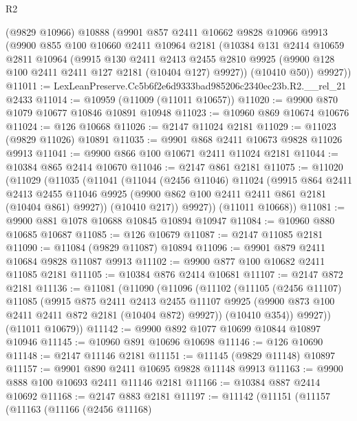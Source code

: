 \begin{lexlean}{R2}
\begin{coremodule}
    (@9829 @10966)
    @10888
    (@9901
      @857
      @2411
      @10662
      @9828
      @10966
      @9913
      (@9900
        @855
        @100
        @10660
        @2411
        @10964
        @2181
        (@10384
          @131
          @2414
          @10659
          @2811
          @10964
          (@9915
            @130
            @2411
            @2413
            @2455
            @2810
            @9925
            (@9900 @128 @100 @2411 @2411 @127 @2181 (@10404 @127) @9927))
          (@10410 @50))
        @9927))
@11011 := LexLeanPreserve.Cc5b6f2e6d9333bad985206c2340ec23b.R2.__rel_21 @2433
@11014 := @10959 (@11009 (@11011 @10657))
@11020 := @9900 @870 @1079 @10677 @10846 @10891 @10948
@11023 := @10960 @869 @10674 @10676
@11024 := @126 @10668
@11026 := @2147 @11024 @2181
@11029 := @11023 (@9829 @11026) @10891
@11035 := @9901 @868 @2411 @10673 @9828 @11026 @9913
@11041 := @9900 @866 @100 @10671 @2411 @11024 @2181
@11044 := @10384 @865 @2414 @10670
@11046 := @2147 @861 @2181
@11075 := @11020
    (@11029
      (@11035
        (@11041
          (@11044
            (@2456 @11046)
            @11024
            (@9915
              @864
              @2411
              @2413
              @2455
              @11046
              @9925
              (@9900 @862 @100 @2411 @2411 @861 @2181 (@10404 @861) @9927))
            (@10410 @217))
          @9927))
      (@11011 @10668))
@11081 := @9900 @881 @1078 @10688 @10845 @10894 @10947
@11084 := @10960 @880 @10685 @10687
@11085 := @126 @10679
@11087 := @2147 @11085 @2181
@11090 := @11084 (@9829 @11087) @10894
@11096 := @9901 @879 @2411 @10684 @9828 @11087 @9913
@11102 := @9900 @877 @100 @10682 @2411 @11085 @2181
@11105 := @10384 @876 @2414 @10681
@11107 := @2147 @872 @2181
@11136 := @11081
    (@11090
      (@11096
        (@11102
          (@11105
            (@2456 @11107)
            @11085
            (@9915
              @875
              @2411
              @2413
              @2455
              @11107
              @9925
              (@9900 @873 @100 @2411 @2411 @872 @2181 (@10404 @872) @9927))
            (@10410 @354))
          @9927))
      (@11011 @10679))
@11142 := @9900 @892 @1077 @10699 @10844 @10897 @10946
@11145 := @10960 @891 @10696 @10698
@11146 := @126 @10690
@11148 := @2147 @11146 @2181
@11151 := @11145 (@9829 @11148) @10897
@11157 := @9901 @890 @2411 @10695 @9828 @11148 @9913
@11163 := @9900 @888 @100 @10693 @2411 @11146 @2181
@11166 := @10384 @887 @2414 @10692
@11168 := @2147 @883 @2181
@11197 := @11142
    (@11151
      (@11157
        (@11163
          (@11166
            (@2456 @11168)

\end{coremodule}
\end{lexlean}
